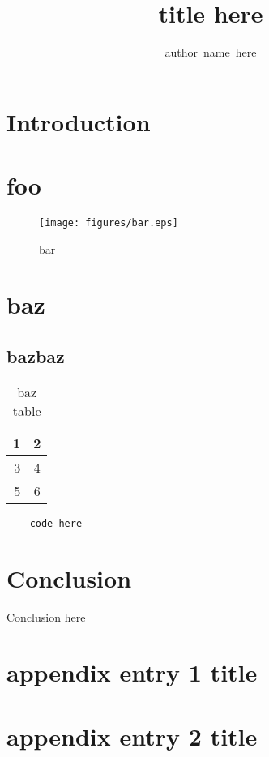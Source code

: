 \documentclass[12pt,journal,a4paper]{IEEEtran}
\begin{document}
\title{title here}
\author{author~name~here}
\maketitle

\begin{abstract}
\end{abstract}

\section{Introduction}

%
\section{foo}
\label{sec:foo}

\begin{figure}[htb]
    \centering
    \texttt{[image: figures/bar.eps]}
    \caption{bar}
    \label{fig:bar}
\end{figure}

%
\section{baz}
\subsection{bazbaz}

\begin{table}[t]
\centering
    \begin{tabular}{|r|c|}
    \hline
        1 & 2\\
    \hline
        3 & 4\\
    \hline
        5 & 6\\
    \hline
    \end{tabular}
\caption{baz table}
\label{tab:baz}
\end{table}

\begin{verbatim}
    code here
\end{verbatim}

%
\section{Conclusion}
Conclusion here


\onecolumn

\appendices
\section{appendix entry 1 title}
\label{}

\section{appendix entry 2 title}
\label{}

\twocolumn


%

\end{document}
